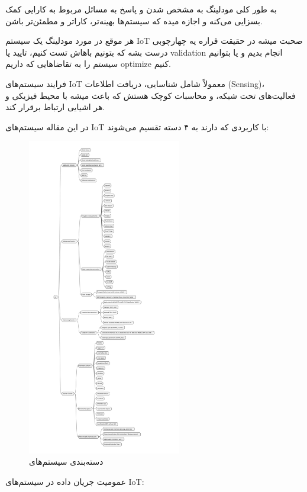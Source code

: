 \documentclass[a4paper]{article}
\begin{document}
به طور کلی مودلینگ به مشخص شدن و پاسخ به مسائل مربوط به کارایی کمک بسزایی می‌کنه
و اجازه میده که سیستم‌ها بهینه‌تر، کاراتر و مطمئن‌تر باشن.

هر موقع در مورد مودلینگ یک سیستم IoT صحبت میشه در حقیقت قراره یه چهارچوبی درست
بشه که بتونیم باهاش تست کنیم، تایید یا validation انجام بدیم و یا بتوانیم سیستم
را به تقاضا‌هایی که داریم optimize کنیم.

فرایند سیستم‌های IoT معمولاً شامل شناسایی، دریافت اطلاعات (Sensing)، فعالیت‌های
تحت شبکه، و محاسبات کوچک هستش که باعث میشه با محیط فیزیکی و هر اشیایی ارتباط
برقرار کند.

در این مقاله سیستم‌های IoT با کاربردی که دارند به ۴ دسته تقسیم می‌شوند:

\begin{figure}[H]
  \centering
  \includegraphics[width=0.6\textwidth]{./figures/iot_categories.pdf}
  \caption{دسته‌بندی سیستم‌های }
  \label{fig:iotCategories}
\end{figure}

عمومیت جریان داده در سیستم‌های IoT:
\end{document}
